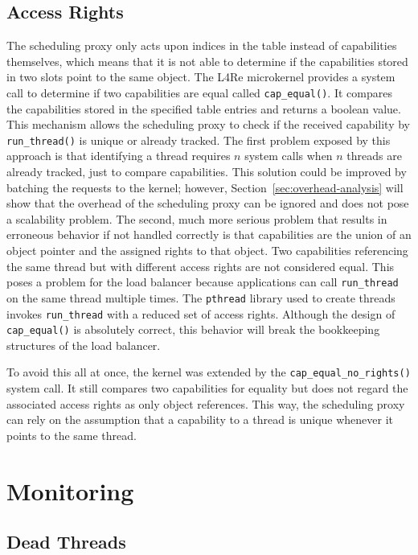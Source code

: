 \subsection{Access Rights}

The scheduling proxy only acts upon indices in the table instead of capabilities themselves, which means that it is not able to determine if the capabilities stored in two slots point to the same object.
The L4Re microkernel provides a system call to determine if two capabilities are equal called \texttt{cap\_equal()}.
It compares the capabilities stored in the specified table entries and returns a boolean value.
This mechanism allows the scheduling proxy to check if the received capability by \texttt{run\_thread()} is unique or already tracked.
The first problem exposed by this approach is that identifying a thread requires $n$ system calls when $n$ threads are already tracked, just to compare capabilities.
This solution could be improved by batching the requests to the kernel; however, Section~\ref{sec:overhead-analysis} will show that the overhead of the scheduling proxy can be ignored and does not pose a scalability problem.
The second, much more serious problem that results in erroneous behavior if not handled correctly is that capabilities are the union of an object pointer and the assigned rights to that object.
Two capabilities referencing the same thread but with different access rights are not considered equal.
This poses a problem for the load balancer because applications can call \texttt{run\_thread} on the same thread multiple times.
The \texttt{pthread} library used to create threads invokes \texttt{run\_thread} with a reduced set of access rights.
Although the design of \texttt{cap\_equal()} is absolutely correct, this behavior will break the bookkeeping structures of the load balancer.

To avoid this all at once, the kernel was extended by the \texttt{cap\_equal\_no\_rights()} system call.
It still compares two capabilities for equality but does not regard the associated access rights as only object references.
This way, the scheduling proxy can rely on the assumption that a capability to a thread is unique whenever it points to the same thread.

\section{Monitoring}
\label{sec:monitoring}

\subsection{Dead Threads}


